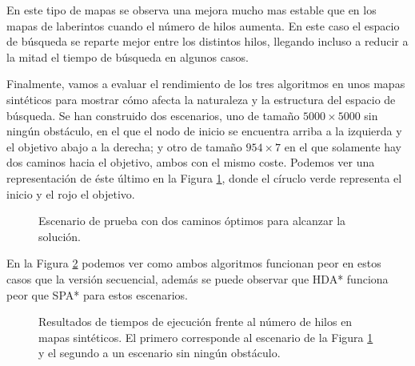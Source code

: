 \documentclass[a4paper,12pt]{article}
\begin{document}
En este tipo de mapas se observa una mejora mucho mas estable que en los mapas de laberintos cuando el número de hilos aumenta. En este caso el espacio de búsqueda se reparte mejor entre los distintos hilos, llegando incluso a reducir a la mitad el tiempo de búsqueda en algunos casos.

Finalmente, vamos a evaluar el rendimiento de los tres algoritmos en unos mapas sintéticos para mostrar cómo afecta la naturaleza y la estructura del espacio de búsqueda. Se han construido dos escenarios, uno de tamaño $5000 \times 5000$ sin ningún obstáculo, en el que el nodo de inicio se encuentra arriba a la izquierda y el objetivo abajo a la derecha; y otro de tamaño $954 \times 7$ en el que solamente hay dos caminos hacia el objetivo, ambos con el mismo coste. Podemos ver una representación de éste último en la Figura \ref{fig:custom}, donde el círuclo verde representa el inicio y el rojo el objetivo.

\begin{figure}[H]
    \centering
    
    \caption{Escenario de prueba con dos caminos óptimos para alcanzar la solución.}
    \label{fig:custom}
\end{figure}

En la Figura \ref{synthetic} podemos ver como ambos algoritmos funcionan peor en estos casos que la versión secuencial, además se puede observar que HDA* funciona peor que SPA* para estos escenarios. 

\begin{figure}[H]
    \centering
    \begin{subfigure}[b]{0.49\textwidth}
        
    \end{subfigure}
    \hfill
    \begin{subfigure}[b]{0.49\textwidth}
        
    \end{subfigure}

    \caption{Resultados de tiempos de ejecución frente al número de hilos en mapas sintéticos. El primero corresponde al escenario de la Figura \ref{fig:custom} y el segundo a un escenario sin ningún obstáculo.}
    \label{synthetic}
\end{figure}
\end{document}
